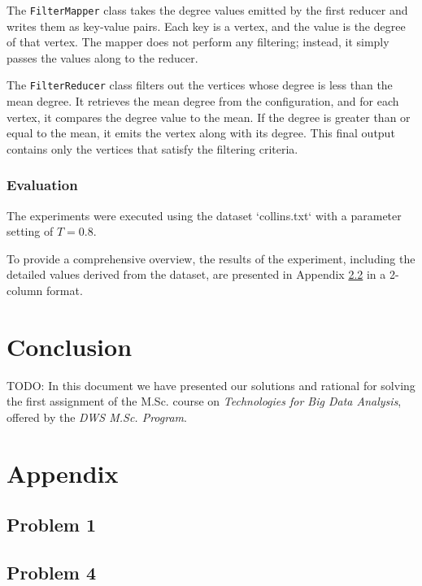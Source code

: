 \documentclass[acmlarge]{acmart}
\begin{document}
The \texttt{FilterMapper} class takes the degree values emitted by the first reducer and writes them as key-value pairs.
Each key is a vertex, and the value is the degree of that vertex.
The mapper does not perform any filtering; instead, it simply passes the values along to the reducer.

The \texttt{FilterReducer} class filters out the vertices whose degree is less than the mean degree.
It retrieves the mean degree from the configuration, and for each vertex, it compares the degree value to the mean.
If the degree is greater than or equal to the mean, it emits the vertex along with its degree.
This final output contains only the vertices that satisfy the filtering criteria.

\subsubsection{Evaluation}
The experiments were executed using the dataset `collins.txt` with a parameter setting of \( T = 0.8 \).

To provide a comprehensive overview, the results of the experiment, including the detailed values derived from the
dataset, are presented in Appendix \ref{sec:data4} in a 2-column format.



\section{Conclusion}
\label{sec:conclusion}
TODO: In this document we have presented our solutions and rational for solving the first assignment of the M.Sc.
course
on \emph{Technologies for Big Data Analysis}, offered by the \emph{DWS M.Sc. Program}.

\appendix
\section{Appendix}
\subsection{Problem 1}
\label{sec:data1}


\subsection{Problem 4}
\label{sec:data4}

\end{document}
